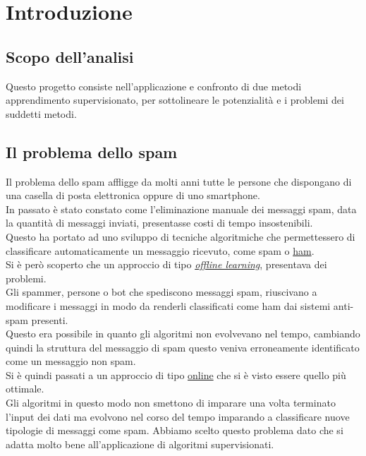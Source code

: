 \newpage
\section{Introduzione}
\subsection{Scopo dell'analisi}
Questo progetto consiste nell'applicazione e confronto di due metodi apprendimento supervisionato, per sottolineare le potenzialità e i problemi dei suddetti metodi.

\subsection{Il problema dello spam}
Il problema dello spam affligge da molti anni tutte le persone che dispongano di una casella di posta elettronica oppure di uno smartphone.\\
In passato è stato constato come l'eliminazione manuale dei messaggi spam, data la quantità di messaggi inviati, presentasse costi di tempo insostenibili.\\
Questo ha portato ad uno sviluppo di tecniche algoritmiche che permettessero di classificare automaticamente un messaggio ricevuto, come spam o \href{https://en.wiktionary.org/wiki/ham_e-mail}{ham}.\\
Si è però scoperto che un approccio di tipo \href{https://en.wikipedia.org/wiki/Offline_learning}{\textit{offline learning}}, presentava dei problemi.\\
Gli spammer, persone o bot che spediscono messaggi spam, riuscivano a modificare i messaggi in modo da renderli classificati come ham dai sistemi anti-spam presenti.\\
Questo era possibile in quanto gli algoritmi non evolvevano nel tempo, cambiando quindi la struttura del messaggio di spam questo veniva erroneamente identificato come un messaggio non spam.\\
Si è quindi passati a un approccio di tipo \href{https://en.wikipedia.org/wiki/Online_algorithm}{online} che si è visto essere quello più ottimale.\\
Gli algoritmi in questo modo non smettono di imparare una volta terminato l'input dei dati ma evolvono nel corso del tempo imparando a classificare nuove tipologie di messaggi come spam.
Abbiamo scelto questo problema dato che si adatta molto bene all'applicazione di algoritmi supervisionati. 
